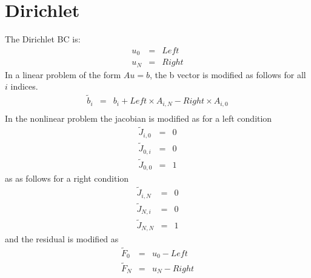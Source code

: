 \documentclass[12pt]{article}
\begin{document}
\section{Dirichlet}
The Dirichlet BC is:
\begin{eqnarray}
u_0 & = & Left \\
u_N & = & Right
\end{eqnarray}
In a linear problem of the form $A u = b$, the b vector is modified as follows for all $i$ indices.
\begin{eqnarray}
\tilde{b}_i & = & b_i + Left\times A_{i,N} - Right\times A_{i,0}\\
\end{eqnarray}
In the nonlinear problem the jacobian is modified as for a left condition
\begin{eqnarray}
\tilde{J}_{i,0} & = & 0\\
\tilde{J}_{0,i} & = & 0\\
\tilde{J}_{0,0} & = & 1
\end{eqnarray}
as as follows for a right condition
\begin{eqnarray}
\tilde{J}_{i,N} & = & 0\\
\tilde{J}_{N,i} & = & 0\\
\tilde{J}_{N,N} & = & 1
\end{eqnarray}
and the residual is modified as
\begin{eqnarray}
\tilde{F}_0 & = & u_0 - Left\\ 
\tilde{F}_N & = & u_N - Right 
\end{eqnarray}
\end{document}
